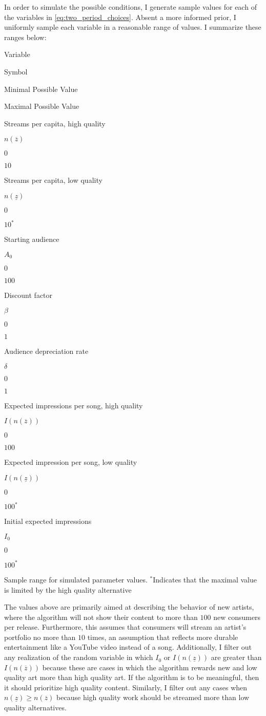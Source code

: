 \documentclass[
]{article}
\begin{document}
In order to simulate the possible conditions, I generate sample values
for each of the variables in \ref{eq:two_period_choices}. Absent a more
informed prior, I uniformly sample each variable in a reasonable range
of values. I summarize these ranges below:

Variable

Symbol

Minimal Possible Value

Maximal Possible Value

Streams per capita, high quality

\(n(\overline z)\)

\(0\)

\(10\)

Streams per capita, low quality

\(n(\underline z)\)

\(0\)

\(10^*\)

Starting audience

\(A_0\)

\(0\)

\(100\)

Discount factor

\(\beta\)

\(0\)

\(1\)

Audience depreciation rate

\(\delta\)

\(0\)

\(1\)

Expected impressions per song, high quality

\(I(n(\overline z))\)

\(0\)

\(100\)

Expected impression per song, low quality

\(I(n(\underline z))\)

\(0\)

\(100^*\)

Initial expected impressions

\(I_0\)

\(0\)

\(100^*\)

Sample range for simulated parameter values. \(^*\)Indicates that the
maximal value is limited by the high quality alternative

The values above are primarily aimed at describing the behavior of new
artists, where the algorithm will not show their content to more than
\(100\) new consumers per release. Furthermore, this assumes that
consumers will stream an artist's portfolio no more than \(10\) times,
an assumption that reflects more durable entertainment like a YouTube
video instead of a song. Additionally, I filter out any realization of
the random variable in which \(I_0\) or \(I(n(\underline z))\) are
greater than \(I(n(\overline z))\) because these are cases in which the
algorithm rewards new and low quality art more than high quality art. If
the algorithm is to be meaningful, then it should prioritize high
quality content. Similarly, I filter out any cases when
\(n(\underline{z})\geq n(\overline{z})\) because high quality work
should be streamed more than low quality alternatives.
\end{document}
